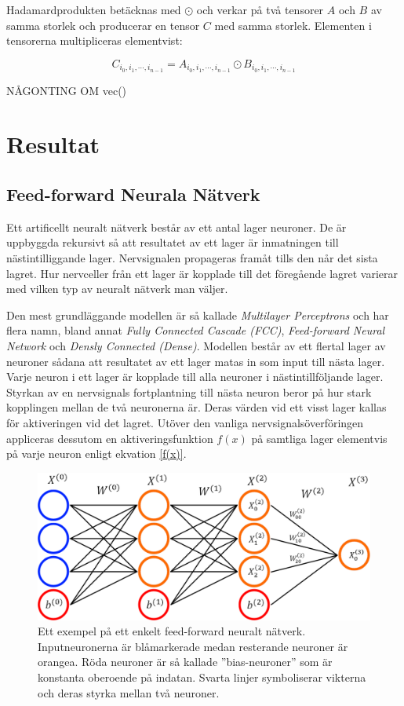 \documentclass[a4paper,11pt,twoside]{article}
\begin{document}
Hadamardprodukten betäcknas med $\odot$ och verkar på två tensorer $A$ och $B$ av samma storlek och producerar en tensor $C$ med samma storlek. Elementen i tensorerna multipliceras elementvist:

\begin{equation}
	C_{i_0, i_1, \cdots, i_{n-1}} = A_{i_0, i_1, \cdots, i_{n-1}} \odot B_{i_0, i_1, \cdots, i_{n-1}}
\end{equation}

NÅGONTING OM vec()





\section{Resultat}
\subsection{Feed-forward Neurala Nätverk}
Ett artificellt neuralt nätverk består av ett antal lager neuroner. De är uppbyggda rekursivt så att resultatet av ett lager är inmatningen till nästintilliggande lager. Nervsignalen propageras framåt tills den når det sista lagret. Hur nervceller från ett lager är kopplade till det föregående lagret varierar med vilken typ av neuralt nätverk man väljer.

Den mest grundläggande modellen är så kallade \textit{Multilayer Perceptrons} och har flera namn, bland annat \textit{Fully Connected Cascade (FCC)}, \textit{Feed-forward Neural Network} och \textit{Densly Connected (Dense)}. Modellen består av ett flertal lager av neuroner sådana att resultatet av ett lager matas in som input till nästa lager. Varje neuron i ett lager är kopplade till alla neuroner i nästintillföljande lager. Styrkan av en nervsignals fortplantning till nästa neuron beror på hur stark kopplingen mellan de två neuronerna är. Deras värden vid ett visst lager kallas för aktiveringen vid det lagret. Utöver den vanliga nervsignalsöverföringen appliceras dessutom en aktiveringsfunktion $f(x)$ på samtliga lager elementvis på varje neuron enligt ekvation \eqref{f(x)}.

\begin{figure}[h]\label{figFCC}
	\centering
  		\includegraphics[scale=0.4]{FCC.png}
  	\caption{Ett exempel på ett enkelt feed-forward neuralt nätverk. Inputneuronerna är blåmarkerade medan resterande neuroner är orangea. Röda neuroner är så kallade ”bias-neuroner” som är konstanta oberoende på indatan. Svarta linjer symboliserar vikterna och deras styrka mellan två neuroner.}
\end{figure}
\end{document}

